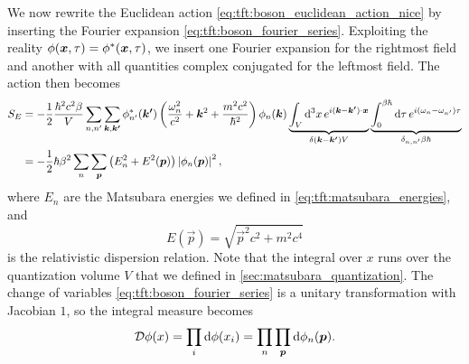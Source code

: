 We now rewrite the Euclidean action \eqref{eq:tft:boson_euclidean_action_nice} by inserting the Fourier expansion \eqref{eq:tft:boson_fourier_series}.
Exploiting the reality $\phi({\bm{x}}, \tau) = {\phi}^*({\bm{x}}, \tau)$, we insert one Fourier expansion for the rightmost field and another with all quantities complex conjugated for the leftmost field.
The action then becomes
\begin{equation}
\begin{split}
	S_E & = -\frac12 \frac{\hbar^2 c^2 \beta}{V}
	        \sum_{n,n'} \sum_{{\bm{k}},{\bm{k'}}} 
	    	  {\phi}^*_{n'}({\bm{k'}}) 
	    	  \left( \frac{\omega_n^2}{c^2} + {\bm{k}}^2 + \frac{m^2 c^2}{\hbar^2} \right)
	  	  \phi_{n}({\bm{k}})
	  	  \underbrace{\int_V \mathop{}\!\mathrm{d}^3 x \, e^{i ({\bm{k}} - {\bm{k'}}) \cdot {\bm{x}}}}_{\delta({\bm{k}}-{\bm{k'}}) V}
	      \underbrace{\int_0^{\beta \hbar} \mathop{}\!\mathrm{d} \tau \, e^{i (\omega_n - \omega_{n'}) \tau}}_{\delta_{n,n'} \beta \hbar}
	  	  \\
	    & = -\frac12 \hbar \beta^2
	        \sum_n \sum_{\bm{p}}
	  	    \left( E_n^2 + E^2({\bm{p}}) \right)
		    \left\lvert \phi_{n}({\bm{p}}) \right\rvert^2 ,
\end{split}
\label{eq:tft:boson_action_fourier}
\end{equation}
where $E_n$ are the Matsubara energies we defined in \cref{eq:tft:matsubara_energies}, and
\begin{equation}
	E(\vec{p}) = \sqrt{\vec{p}^2 c^2 + m^2 c^4}
\label{eq:tft:dispersion}
\end{equation}
is the relativistic dispersion relation.
Note that the integral over $x$ runs over the quantization volume $V$ that we defined in \cref{sec:matsubara_quantization}.
The change of variables \eqref{eq:tft:boson_fourier_series} is a unitary transformation with Jacobian $1$, so the integral measure becomes
\begin{equation}
	\mathcal{D} \phi(x) =
	\prod_i \mathop{}\!\mathrm{d} \phi(x_i) =
	\prod_n \prod_{\bm{p}} \mathop{}\!\mathrm{d} \phi_n({\bm{p}}) .
\label{eq:tft:boson_integral_new_variables}
\end{equation}

